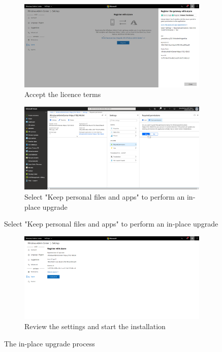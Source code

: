 \begin{figure}[h]\ContinuedFloat
	\begin{subfigure}{0.5\textwidth}
		\captionsetup{width=0.8\linewidth}
		\includegraphics[width=0.9\linewidth]{img/WAC_Azure_4.png}
		\centering
		\caption{Accept the licence terms}
		\label{fig:WACAzure4}
	\end{subfigure}
	\begin{subfigure}{0.5\textwidth}
		\captionsetup{width=0.8\linewidth}
		\includegraphics[width=0.9\linewidth]{img/WAC_Azure_5.png} 
		\centering
		\caption{Select "Keep personal files and apps" to perform an in-place upgrade}
		\label{fig:WACAzure5}
	\end{subfigure}
\end{figure}
\begin{figure}[h]\ContinuedFloat
	\begin{subfigure}{\textwidth}
		\captionsetup{width=0.8\linewidth}
		\includegraphics[width=0.9\linewidth]{img/WAC_Azure_6.png}
		\centering
		\caption{Review the settings and start the installation}
		\label{fig:WACAzure6}
	\end{subfigure}
	\caption{The in-place upgrade process}
	\label{fig:WACAzure}
\end{figure}